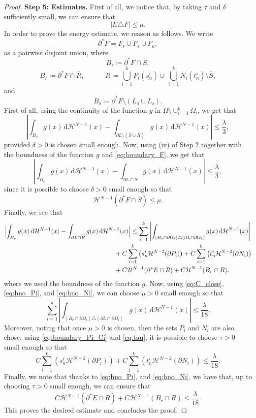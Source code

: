 \documentclass[a4paper, 11pt, reqno]{amsart}
\theoremstyle{plain}
\theoremstyle{definition}
\theoremstyle{remark}
\newcommand{\hno}{{\mathcal H}^{N-1}}
\newcommand{\dd}{\,\mathrm{d}}
\begin{document}
\begin{proof}
\textbf{Step 5: Estimates.}
First of all, we notice that, by taking $\tau$ and $\delta$ sufficiently small, we can ensure that
\[
|E\triangle F|\leq \mu.
\]
In order to prove the energy estimate, we reason as follows.
We write
\[
\partial^* F = F_r \cup F_s \cup F_a,
\]
as a pairwise disjoint union, where
\[
B_s\coloneqq \partial^* F \cap \overline{S},
\]
\[
B_r\coloneqq \partial^*F\cap \overline{R},\quad\quad\quad
    R\coloneqq \bigcup_{i=1}^k P_i(s^i_n)
    \cup \,
    \bigcup_{i=1}^k N_i(t^i_n)
    \setminus \overline{S},
\]
and
\[
B_o\coloneqq \partial^*F \setminus(L_a\cup L_s).
\]
First of all, using the continuity of the function $g$ in $\Omega\setminus \cup_{i=1}^k \Omega_i$, we get that
\[
\left| \int_{B_o} g(x)\dd\hno(x)
    -  \int_{\partial L\setminus(\overline{S}\cup\overline{R})} g(x)\dd\hno(x) \right| \leq \frac{\lambda}{3},
\]
provided $\delta>0$ is chosen small enough.
Now, using (iv) of Step 2 together with the boundness of the function $g$ and \eqref{eq:boundary_F}, we get that
\[
\left| \int_{B_s} g(x)\dd\hno(x)
    -  \int_{\partial L\cap \overline{S}} g(x)\dd\hno(x) \right| \leq \frac{\lambda}{3},
\]
since it is possible to choose $\delta>0$ small enough so that
\[
\hno(\partial^* F\cap \overline{S})\leq \mu.
\]
Finally, we see that
\begin{align}\label{eq:est_rectangles}
\Bigl| \int_{B_r} g(x)\dd\hno(x)
   & -  \int_{\partial L\cap \overline{R}} g(x)\dd\hno(x) \Bigr|
    \leq
        \sum_{i=1}^k\left| \int_{(B_r\cap\partial\Omega_i) \triangle (\partial L\cap\partial\Omega_i)} g(x)\dd\hno(x)  \right| \nonumber \\
&\hspace{3cm} + C \sum_{i=1}^k \left( s_n^i \mathcal{H}^{N-2}(\partial P_i) \right)
    + C \sum_{i=1}^k \left( t_n^i \mathcal{H}^{N-2}(\partial N_i) \right)
 \nonumber \\
&\hspace{3cm} + C \hno(\partial^*E \cap R) + C\hno(B_r\cap R),
\end{align}
where we used the boundness of the function $g$.
Now, using \eqref{eq:C_close}, \eqref{eq:hno_Pi}, and \eqref{eq:hno_Ni}, we can choose $\mu>0$ small enough so that
\[
\sum_{i=1}^k\left| \int_{(B_r\cap\partial\Omega_i) \triangle (\partial L\cap\partial\Omega_i)} g(x)\dd\hno(x)  \right| \leq \frac{\lambda}{18}.
\]
Moreover, noting that once $\mu>0$ is chosen, then the sets $P_i$ and $N_i$ are also chose, using \eqref{eq:boundary_Pi_Ci} and \eqref{eq:tau}, it is possible to choose $\tau>0$ small enough so that
\[
C \sum_{i=1}^k \left( s_n^i \mathcal{H}^{N-2}(\partial P_i) \right)
    + C \sum_{i=1}^k \left( t_n^i \mathcal{H}^{N-2}(\partial N_i) \right)
    \leq \frac{\lambda}{18}.
\]
Finally, we note that thanks to \eqref{eq:hno_Pi}, and \eqref{eq:hno_Ni}, we have that, up to choosing $\tau>0$ small enough, we can ensure that
\[
C \hno(\partial^*E \cap R) + C \hno(B_r\cap R) \leq\frac{\lambda}{18}.
\]
This proves the desired estimate and concludes the proof.
\end{proof}
\end{document}
